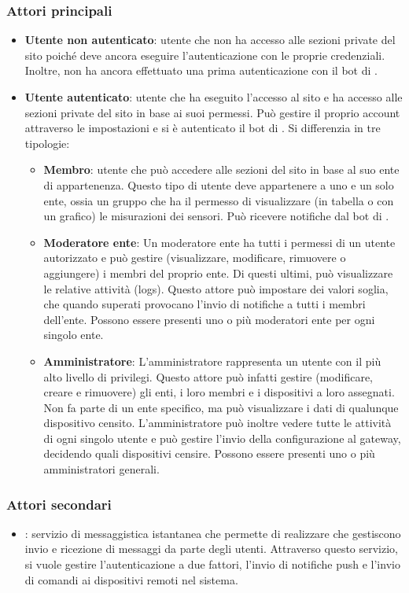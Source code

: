 		\subsubsection{Attori principali}
		\begin{itemize}
			\item \textbf{Utente non autenticato}: utente che non ha accesso alle sezioni private del sito poiché deve ancora eseguire l'autenticazione con le proprie credenziali. Inoltre, non ha ancora effettuato una prima autenticazione con il bot di .

			\item \textbf{Utente autenticato}: utente che ha eseguito l'accesso al sito e ha accesso alle sezioni private del sito in base ai suoi permessi. Può gestire il proprio account attraverso le impostazioni e si è autenticato il bot di . Si differenzia in tre tipologie:

			\begin{itemize}
				\item \textbf{Membro}: utente che può accedere alle sezioni del sito in base al suo ente di appartenenza. Questo tipo di utente deve appartenere a uno e un solo ente, ossia un gruppo che ha il permesso di visualizzare (in tabella o con un grafico) le misurazioni dei sensori. Può ricevere notifiche dal bot di .

				\item \textbf{Moderatore ente}: Un moderatore ente ha tutti i permessi di un utente autorizzato e può gestire (visualizzare, modificare, rimuovere o aggiungere) i membri del proprio ente. Di questi ultimi, può visualizzare le relative attività (logs).
				Questo attore può impostare dei valori soglia, che quando superati provocano l'invio di notifiche a tutti i membri dell'ente.
				Possono essere presenti uno o più moderatori ente per ogni singolo ente.

				\item \textbf{Amministratore}: L'amministratore rappresenta un utente con il più alto livello di privilegi. Questo attore può infatti gestire (modificare, creare e rimuovere) gli enti, i loro membri e i dispositivi a loro assegnati. Non fa parte di un ente specifico, ma può visualizzare i dati di qualunque dispositivo censito. 
				L'amministratore può inoltre vedere tutte le attività di ogni singolo utente e può gestire l'invio della configurazione al gateway, decidendo quali dispositivi censire.
				Possono essere presenti uno o più amministratori generali.
			\end{itemize}
		\end{itemize}
		\subsubsection{Attori secondari}
			\begin{itemize}
				\item {}: servizio di messaggistica istantanea che permette di realizzare  che gestiscono invio e ricezione di messaggi da parte degli utenti. Attraverso questo servizio, si vuole gestire l'autenticazione a due fattori, l'invio di notifiche push e l'invio di comandi ai dispositivi remoti nel sistema.
			\end{itemize}
	